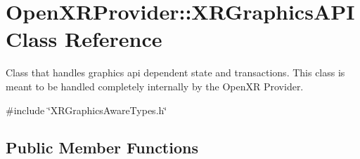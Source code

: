 \hypertarget{class_open_x_r_provider_1_1_x_r_graphics_a_p_i}{}\section{Open\+X\+R\+Provider\+::X\+R\+Graphics\+A\+PI Class Reference}
\label{class_open_x_r_provider_1_1_x_r_graphics_a_p_i}


Class that handles graphics api dependent state and transactions. This class is meant to be handled completely internally by the Open\+XR Provider.  




{\ttfamily \#include \char`\"{}X\+R\+Graphics\+Aware\+Types.\+h\char`\"{}}

\subsection*{Public Member Functions}
